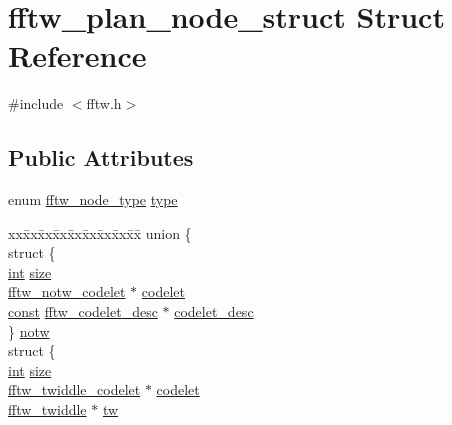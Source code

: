 \hypertarget{structfftw__plan__node__struct}{}\section{fftw\+\_\+plan\+\_\+node\+\_\+struct Struct Reference}
\label{structfftw__plan__node__struct}


{\ttfamily \#include $<$fftw.\+h$>$}

\subsection*{Public Attributes}
\begin{DoxyCompactItemize}
\item 
enum \hyperlink{fftw_8h_a62ecac3f39269a2efca878ca819349f1}{fftw\+\_\+node\+\_\+type} \hyperlink{structfftw__plan__node__struct_a726e9ec82efd03cdc7b8be71c0c7225f}{type}
\item 
\begin{tabbing}
xx\=xx\=xx\=xx\=xx\=xx\=xx\=xx\=xx\=\kill
union \{\\
\>struct \{\\
\>\>\hyperlink{xmltok_8h_a5a0d4a5641ce434f1d23533f2b2e6653}{int} \hyperlink{structfftw__plan__node__struct_a334e1fcc2c98575d85d9a951b9e95941}{size}\\
\>\>\hyperlink{fftw_8h_ab576ee09a52252bf9d93377d2d4185d6}{fftw\_notw\_codelet} $\ast$ \hyperlink{structfftw__plan__node__struct_a25c03594d9b1cbb6233d09b3bc0af418}{codelet}\\
\>\>\hyperlink{getopt1_8c_a2c212835823e3c54a8ab6d95c652660e}{const} \hyperlink{structfftw__codelet__desc}{fftw\_codelet\_desc} $\ast$ \hyperlink{structfftw__plan__node__struct_a7cb707dc27fb4779fbd0ee9cb4d7efd9}{codelet\_desc}\\
\>\} \hyperlink{structfftw__plan__node__struct_a671660613e9459f8bd568155e07f0065}{notw}\\
\>struct \{\\
\>\>\hyperlink{xmltok_8h_a5a0d4a5641ce434f1d23533f2b2e6653}{int} \hyperlink{structfftw__plan__node__struct_a334e1fcc2c98575d85d9a951b9e95941}{size}\\
\>\>\hyperlink{fftw_8h_a0e607cbf221d0515ac452c547963d569}{fftw\_twiddle\_codelet} $\ast$ \hyperlink{structfftw__plan__node__struct_a5974d49a3f2ae9c629156dbfc3effb20}{codelet}\\
\>\>\hyperlink{fftw_8h_a726c4a427d2f70038050e3048b783cb2}{fftw\_twiddle} $\ast$ \hyperlink{structfftw__plan__node__struct_a4a7244edea4157eb541d712ae30e2fab}{tw}\\

\end{tabbing}
\end{DoxyCompactItemize}
